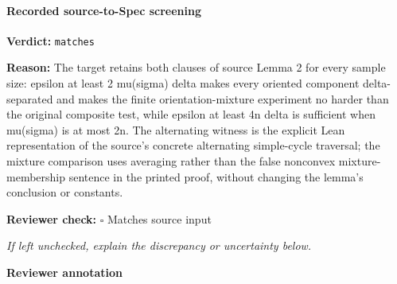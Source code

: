\documentclass[10pt]{article}
\newcommand{\reviewerbox}{%
  \par\noindent\fbox{\parbox{0.96\linewidth}{\rule{0pt}{0.38in}}}\par
}
\newcommand{\reviewmatch}[1]{%
  \par\noindent\textbf{Reviewer check:} $\square$\; #1\par
  \noindent\emph{If left unchecked, explain the discrepancy or uncertainty below.}\par
}
\begin{document}
\paragraph{Recorded source-to-Spec screening}
\textbf{Verdict:} \texttt{matches}
\\
{\raggedright
\textbf{Reason:} The target retains both clauses of source Lemma 2 for every sample size:\allowbreak{} epsilon at least 2 mu(sigma) delta makes every oriented component delta-\allowbreak{}separated and makes the finite orientation-\allowbreak{}mixture experiment no harder than the original composite test, while epsilon at least 4n delta is sufficient when mu(sigma) is at most 2n.\allowbreak{} The alternating witness is the explicit Lean representation of the source's concrete alternating simple-\allowbreak{}cycle traversal;\allowbreak{} the mixture comparison uses averaging rather than the false nonconvex mixture-\allowbreak{}membership sentence in the printed proof, without changing the lemma's conclusion or constants.\allowbreak{}
\par}
\reviewmatch{Matches source input}
\noindent\textbf{Reviewer annotation}\par
\reviewerbox
\end{document}
